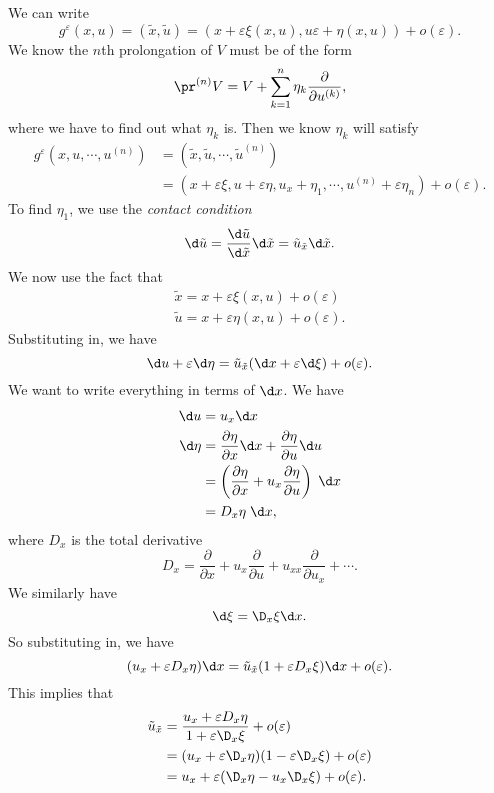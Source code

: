 \documentclass[a4paper]{article}
\begin{document}
We can write
\[
  g^\varepsilon(x, u) = (\tilde{x}, \tilde{u}) = (x + \varepsilon \xi(x, u), u \varepsilon + \eta(x, u)) + o(\varepsilon).
\]
We know the $n$th prolongation of $V$ must be of the form
\[
  \pr^{(n)}V = V + \sum_{k = 1}^n \eta_k\frac{\partial}{\partial u^{(k)}},
\]
where we have to find out what $\eta_k$ is. Then we know $\eta_k$ will satisfy
\begin{align*}
  g^{\varepsilon}(x, u, \cdots, u^{(n)}) &= (\tilde{x}, \tilde{u}, \cdots, \tilde{u}^{(n)})\\
  &= (x + \varepsilon \xi, u + \varepsilon \eta, u_x + \eta_1, \cdots, u^{(n)} + \varepsilon\eta_n) + o(\varepsilon).
\end{align*}
To find $\eta_1$, we use the \emph{contact condition}
\[
  \d \tilde{u} = \frac{\d \tilde{u}}{\d \tilde{x}} \d \tilde{x} = \tilde{u}_{\tilde{x}} \d \tilde{x}.
\]
We now use the fact that
\begin{align*}
  \tilde{x} = x + \varepsilon \xi(x, u) + o(\varepsilon)\\
  \tilde{u} = x + \varepsilon \eta(x, u) + o(\varepsilon).
\end{align*}
Substituting in, we have
\[
  \d u + \varepsilon \d \eta = \tilde{u}_{\tilde{x}}(\d x + \varepsilon \d \xi) + o(\varepsilon).
\]
We want to write everything in terms of $\d x$. We have
\begin{align*}
  \d u &= u_x \d x\\
  \d \eta &= \frac{\partial \eta}{\partial x} \d x + \frac{\partial \eta}{\partial u} \d u\\
  &= \left(\frac{\partial \eta}{\partial x} + u_x \frac{\partial \eta}{\partial u}\right) \;\d x\\
  &= D_x \eta \;\d x,
\end{align*}
where $D_x$ is the total derivative
\[
  D_x = \frac{\partial}{\partial x} + u_x \frac{\partial}{\partial u} + u_{xx} \frac{\partial}{\partial u_x} + \cdots.
\]
We similarly have
\[
  \d \xi = \D_x \xi \d x.
\]
So substituting in, we have
\[
  (u_x + \varepsilon D_x\eta) \d x = \tilde{u}_{\tilde{x}}(1 + \varepsilon D_x \xi) \d x + o(\varepsilon).
\]
This implies that
\begin{align*}
  \tilde{u}_{\tilde{x}} &= \frac{u_x + \varepsilon D_x \eta}{1 + \varepsilon \D_x \xi} + o(\varepsilon)\\
  &= (u_x + \varepsilon \D_x \eta)(1 - \varepsilon \D_x \xi) + o (\varepsilon)\\
  &= u_x + \varepsilon(\D_x \eta - u_x \D_x \xi) + o(\varepsilon).
\end{align*}
\end{document}
